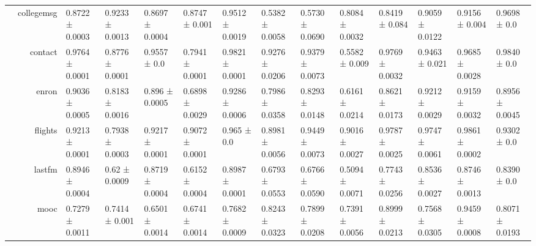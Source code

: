 {\begin{tabular}{@{}crllllllllllll@{}}
                                    & collegemsg           & 0.8722 ± 0.0003           & 0.9233 ± 0.0013            & 0.8697 ± 0.0004           & 0.8747 ± 0.001             & \multicolumn{1}{l|}{0.9512 ± 0.0019} & 0.5382 ± 0.0058           & 0.5730 ± 0.0690           & 0.8084 ± 0.0032          & 0.8419 ± 0.084          & 0.9059 ± 0.0122         & 0.9156 ± 0.004           & 0.9698 ± 0.0               \\
                                    & contact              & 0.9764 ± 0.0001           & 0.8776 ± 0.0001            & 0.9557 ± 0.0              & 0.7941 ± 0.0001            & \multicolumn{1}{l|}{0.9821 ± 0.0001} & 0.9276 ± 0.0206           & 0.9379 ± 0.0073           & 0.5582 ± 0.009           & 0.9769 ± 0.0032         & 0.9463 ± 0.021          & 0.9685 ± 0.0028          & 0.9840 ± 0.0               \\
                                    & enron                & 0.9036 ± 0.0005           & 0.8183 ± 0.0016            & 0.896 ± 0.0005            & 0.6898 ± 0.0029            & \multicolumn{1}{l|}{0.9286 ± 0.0006} & 0.7986 ± 0.0358           & 0.8293 ± 0.0148           & 0.6161 ± 0.0214          & 0.8621 ± 0.0173         & 0.9212 ± 0.0029         & 0.9159 ± 0.0032          & 0.8956 ± 0.0045            \\
                                    & flights              & 0.9213 ± 0.0001           & 0.7938 ± 0.0003            & 0.9217 ± 0.0001           & 0.9072 ± 0.0001            & \multicolumn{1}{l|}{0.965 ± 0.0}     & 0.8981 ± 0.0056           & 0.9449 ± 0.0073           & 0.9016 ± 0.0027          & 0.9787 ± 0.0025         & 0.9747 ± 0.0061         & 0.9861 ± 0.0002          & 0.9302 ± 0.0               \\
                                    & lastfm               & 0.8946 ± 0.0004           & 0.62 ± 0.0009              & 0.8719 ± 0.0004           & 0.6152 ± 0.0004            & \multicolumn{1}{l|}{0.8987 ± 0.0001} & 0.6793 ± 0.0553           & 0.6766 ± 0.0590           & 0.5094 ± 0.0071          & 0.7743 ± 0.0256         & 0.8536 ± 0.0027         & 0.8746 ± 0.0013          & 0.8390 ± 0.0               \\
                                    & mooc                 & 0.7279 ± 0.0011           & 0.7414 ± 0.001             & 0.6501 ± 0.0014           & 0.6741 ± 0.0014            & \multicolumn{1}{l|}{0.7682 ± 0.0009} & 0.8243 ± 0.0323           & 0.7899 ± 0.0208           & 0.7391 ± 0.0056          & 0.8999 ± 0.0213         & 0.7568 ± 0.0305         & 0.9459 ± 0.0008          & 0.8071 ± 0.0193            \\

\end{tabular}}
